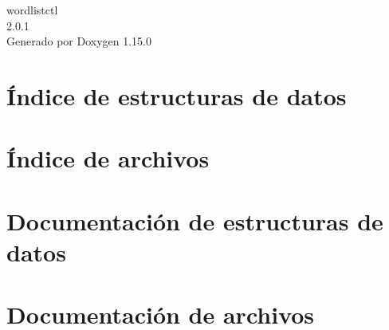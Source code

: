 \documentclass[twoside]{book}
\newcommand{\+}{\discretionary{\mbox{\scriptsize$\hookleftarrow$}}{}{}}
\newcommand{\clearemptydoublepage}{%
    \newpage{\pagestyle{empty}\cleardoublepage}%
  }
\begin{document}
  \raggedbottom
    \hypersetup{pageanchor=false,
                bookmarksnumbered=true,
                pdfencoding=unicode
               }
  \begin{titlepage}
  \vspace*{7cm}
  \begin{center}%
  {\Large wordlistctl}\\
  [1ex]\large 2.\+0.\+1 \\
  \vspace*{1cm}
  {\large Generado por Doxygen 1.15.0}\\
  \end{center}
  \end{titlepage}
  \clearemptydoublepage
  \tableofcontents
  \clearemptydoublepage
  \hypersetup{pageanchor=true}

\chapter{Índice de estructuras de datos}

\chapter{Índice de archivos}

\chapter{Documentación de estructuras de datos}



\chapter{Documentación de archivos}




  \backmatter
  \newpage
  \clearemptydoublepage
  \printindex
\end{document}
